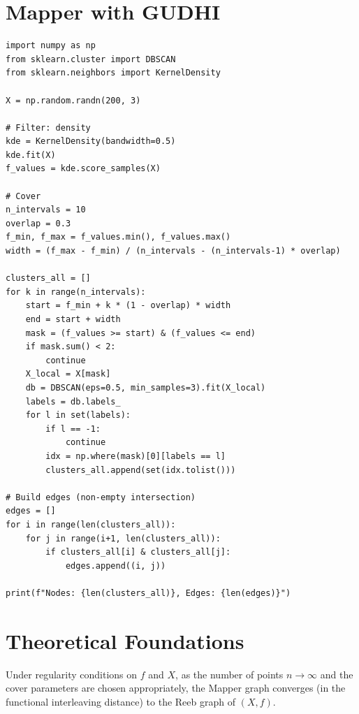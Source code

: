 \section{Mapper with GUDHI}

\begin{codeblock}[title=\textbf{Manual Mapper Construction}]
\begin{verbatim}
import numpy as np
from sklearn.cluster import DBSCAN
from sklearn.neighbors import KernelDensity

X = np.random.randn(200, 3)

# Filter: density
kde = KernelDensity(bandwidth=0.5)
kde.fit(X)
f_values = kde.score_samples(X)

# Cover
n_intervals = 10
overlap = 0.3
f_min, f_max = f_values.min(), f_values.max()
width = (f_max - f_min) / (n_intervals - (n_intervals-1) * overlap)

clusters_all = []
for k in range(n_intervals):
    start = f_min + k * (1 - overlap) * width
    end = start + width
    mask = (f_values >= start) & (f_values <= end)
    if mask.sum() < 2:
        continue
    X_local = X[mask]
    db = DBSCAN(eps=0.5, min_samples=3).fit(X_local)
    labels = db.labels_
    for l in set(labels):
        if l == -1:
            continue
        idx = np.where(mask)[0][labels == l]
        clusters_all.append(set(idx.tolist()))

# Build edges (non-empty intersection)
edges = []
for i in range(len(clusters_all)):
    for j in range(i+1, len(clusters_all)):
        if clusters_all[i] & clusters_all[j]:
            edges.append((i, j))

print(f"Nodes: {len(clusters_all)}, Edges: {len(edges)}")
\end{verbatim}
\end{codeblock}

\section{Theoretical Foundations}

\begin{theorem}
Under regularity conditions on $f$ and $X$, as the number of points
$n \to \infty$ and the cover parameters are chosen appropriately, the
Mapper graph converges (in the functional interleaving distance) to the
Reeb graph of $(X, f)$.
\end{theorem}

